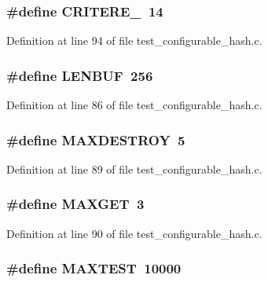 \subsubsection[{CRITERE\_\-2}]{\setlength{\rightskip}{0pt plus 5cm}\#define CRITERE\_~14}\label{test__configurable__hash_8c_ad449333f1ec8fe49765893cc1980d94d}


Definition at line 94 of file test\_\-configurable\_\-hash.c.
\subsubsection[{LENBUF}]{\setlength{\rightskip}{0pt plus 5cm}\#define LENBUF~256}\label{test__configurable__hash_8c_a799f2d62ff1a8069195e037a3b7905ae}


Definition at line 86 of file test\_\-configurable\_\-hash.c.
\subsubsection[{MAXDESTROY}]{\setlength{\rightskip}{0pt plus 5cm}\#define MAXDESTROY~5}\label{test__configurable__hash_8c_a428c97a2aa1643805f8b16275c702607}


Definition at line 89 of file test\_\-configurable\_\-hash.c.
\subsubsection[{MAXGET}]{\setlength{\rightskip}{0pt plus 5cm}\#define MAXGET~3}\label{test__configurable__hash_8c_a7d82597c4bd22fe023995390a5a90f95}


Definition at line 90 of file test\_\-configurable\_\-hash.c.
\subsubsection[{MAXTEST}]{\setlength{\rightskip}{0pt plus 5cm}\#define MAXTEST~10000}\label{test__configurable__hash_8c_a03d9dd35a7b43ebc597de16d46a0e845}


